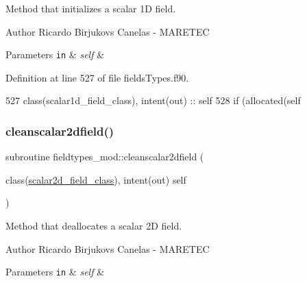 Method that initializes a scalar 1D field. 

\begin{DoxyAuthor}{Author}
Ricardo Birjukovs Canelas -\/ M\+A\+R\+E\+T\+EC 
\end{DoxyAuthor}

\begin{DoxyParams}[1]{Parameters}
\mbox{\tt in}  & {\em self} & \\
\hline
\end{DoxyParams}


Definition at line 527 of file fields\+Types.\+f90.


\begin{DoxyCode}
527     \textcolor{keywordtype}{class}(scalar1d\_field\_class), \textcolor{keywordtype}{intent(out)} :: self
528     \textcolor{keywordflow}{if} (\textcolor{keyword}{allocated}(self%
\end{DoxyCode}
\mbox{\label{namespacefieldtypes__mod_a26a4170db6067cf4ba85099f9701ff4c}} 
\subsubsection{\texorpdfstring{cleanscalar2dfield()}{cleanscalar2dfield()}}
{\footnotesize\ttfamily subroutine fieldtypes\+\_\+mod\+::cleanscalar2dfield (\begin{DoxyParamCaption}\item[{class(\mbox{\hyperlink{structfieldtypes__mod_1_1scalar2d__field__class}{scalar2d\+\_\+field\+\_\+class}}), intent(out)}]{self }\end{DoxyParamCaption})\hspace{0.3cm}{\ttfamily [private]}}



Method that deallocates a scalar 2D field. 

\begin{DoxyAuthor}{Author}
Ricardo Birjukovs Canelas -\/ M\+A\+R\+E\+T\+EC 
\end{DoxyAuthor}

\begin{DoxyParams}[1]{Parameters}
\mbox{\tt in}  & {\em self} & \\
\hline
\end{DoxyParams}



